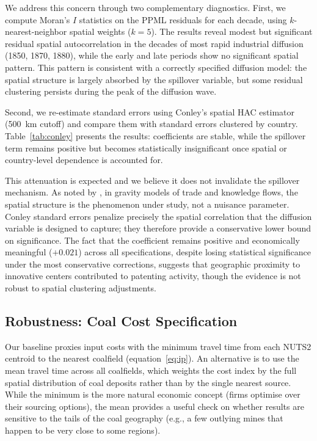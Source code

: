 \documentclass[letterpaper,12pt,leqno]{article}
\begin{document}
We address this concern through two complementary diagnostics. First, we compute Moran's \(I\) statistics on the PPML residuals for each decade, using \(k\)-nearest-neighbor spatial weights (\(k = 5\)). The results reveal modest but significant residual spatial autocorrelation in the decades of most rapid industrial diffusion (1850, 1870, 1880), while the early and late periods show no significant spatial pattern. This pattern is consistent with a correctly specified diffusion model: the spatial structure is largely absorbed by the spillover variable, but some residual clustering persists during the peak of the diffusion wave.

Second, we re-estimate standard errors using Conley's \citeyearpar{conley1999gmm} spatial HAC estimator (500~km cutoff) and compare them with standard errors clustered by country. Table~\ref{tab:conley} presents the results: coefficients are stable, while the spillover term remains positive but becomes statistically insignificant once spatial or country-level dependence is accounted for.

This attenuation is expected and we believe it does not invalidate the spillover mechanism. As noted by \citet{head2014gravity}, in gravity models of trade and knowledge flows, the spatial structure is the phenomenon under study, not a nuisance parameter. Conley standard errors penalize precisely the spatial correlation that the diffusion variable is designed to capture; they therefore provide a conservative lower bound on significance. The fact that the coefficient remains positive and economically meaningful (\(+0.021\)) across all specifications, despite losing statistical significance under the most conservative corrections, suggests that geographic proximity to innovative centers contributed to patenting activity, though the evidence is not robust to spatial clustering adjustments.



\subsection{Robustness: Coal Cost Specification}
\label{sec:rob_coal}

Our baseline proxies input costs with the minimum travel time from each NUTS2 centroid to the nearest coalfield (equation~\eqref{eq:ip}). An alternative is to use the mean travel time across all coalfields, which weights the cost index by the full spatial distribution of coal deposits rather than by the single nearest source. While the minimum is the more natural economic concept (firms optimise over their sourcing options), the mean provides a useful check on whether results are sensitive to the tails of the coal geography (e.g., a few outlying mines that happen to be very close to some regions).
\end{document}
